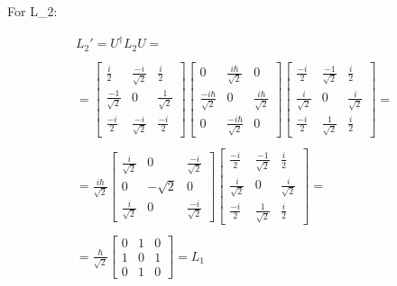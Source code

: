 For L_2:

\begin{equation}
  \begin{array}{c}
    L_2' = U^\dagger L_2 U =
    \\

    \\
    = \left[\begin{matrix}
      \frac{i}{2} & \frac{-i}{\sqrt{2}} & \frac{i}{2}\\
      \frac{-1}{\sqrt{2}} & 0 & \frac{1}{\sqrt{2}}\\
      \frac{-i}{2} & \frac{-i}{\sqrt{2}} & \frac{-i}{2}
    \end{matrix}\right]
    \left[\begin{matrix}
      0 & \frac{i\hbar}{\sqrt{2}} & 0\\
      \frac{-i\hbar}{\sqrt{2}} & 0 & \frac{i\hbar}{\sqrt{2}}\\
      0 & \frac{-i\hbar}{\sqrt{2}} & 0
    \end{matrix}\right]
    \left[\begin{matrix}
      \frac{-i}{2} & \frac{-1}{\sqrt{2}} & \frac{i}{2}\\
      \frac{i}{\sqrt{2}} & 0 & \frac{i}{\sqrt{2}}\\
      \frac{-i}{2} & \frac{1}{\sqrt{2}} & \frac{i}{2}
    \end{matrix}\right] =
    \\

    \\
    = \frac{i\hbar}{\sqrt{2}}\left[\begin{matrix}
      \frac{i}{\sqrt{2}} & 0 & \frac{-i}{\sqrt{2}}\\
      0 & -\sqrt{2} & 0\\
      \frac{i}{\sqrt{2}} & 0 & \frac{-i}{\sqrt{2}}
    \end{matrix}\right]\left[
      \begin{matrix}
      \frac{-i}{2} & \frac{-1}{\sqrt{2}} & \frac{i}{2}\\
      \frac{i}{\sqrt{2}} & 0 & \frac{i}{\sqrt{2}}\\
      \frac{-i}{2} & \frac{1}{\sqrt{2}} & \frac{i}{2}
      \end{matrix}
    \right] =
    \\

    \\
    = \frac{\hbar}{\sqrt{2}}\left[\begin{matrix}
      0 & 1 & 0\\
      1 & 0 & 1\\
      0 & 1 & 0
    \end{matrix}\right] = L_1
  \end{array}
\end{equation}

